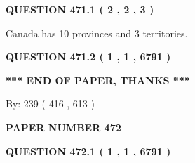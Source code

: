 \documentclass[12pt]{article}
\begin{document}
   
 \vspace{0.2in}
 
 
 
 
   
   
  
\vspace{0.2in}
  
{\textbf{\Large{QUESTION
471.1 
 ( 2 , 2 , 3 )
}}}
  
  
 
 
\noindent{}
 
 
Canada has 10  provinces and 3 territories.
 
 
 
 
  
\vspace{0.2in}
  
{\textbf{\Large{QUESTION
471.2 
 ( 1 , 1 , 6791 )
}}}
  
  
   
   
 \vspace{0.2in}
 
   
   
   
   
\vspace{1.0in} 
{\textbf{\large{ *** END OF PAPER, THANKS *** }}} 
   
   
\hspace{1.0in} By: 
 239 ( 416 ,  613 )
   
   
   
   
\newpage 
\setcounter{page}{ 
   472001 } 
   
   
   
   
 {\textbf{ \Large{ PAPER NUMBER  472  }}}
   
   
\vspace{0.2in}
   
   
   
   
   
   
 \vspace{0.2in}
 
 
 
 
   
   
  
\vspace{0.2in}
  
{\textbf{\Large{QUESTION
472.1 
 ( 1 , 1 , 6791 )
}}}
  
  
  
\end{document}
